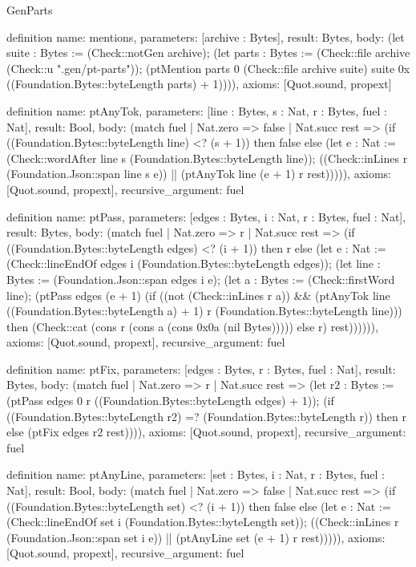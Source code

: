\begin{lexlean}{GenParts}
\begin{semanticmodule}
definition{
  name: mentions,
  parameters: [archive : Bytes],
  result: Bytes,
  body: (let suite : Bytes := (Check::notGen archive); (let parts : Bytes := (Check::file archive (Check::u ".gen/pt-parts")); (ptMention parts 0 (Check::file archive suite) suite 0x ((Foundation.Bytes::byteLength parts) + 1)))),
  axioms: [Quot.sound, propext]
}

definition{
  name: ptAnyTok,
  parameters: [line : Bytes, s : Nat, r : Bytes, fuel : Nat],
  result: Bool,
  body: (match fuel
    | Nat.zero => false
    | Nat.succ rest => (if ((Foundation.Bytes::byteLength line) <? (s + 1)) then false else (let e : Nat := (Check::wordAfter line s (Foundation.Bytes::byteLength line)); ((Check::inLines r (Foundation.Json::span line s e)) || (ptAnyTok line (e + 1) r rest))))),
  axioms: [Quot.sound, propext],
  recursive_argument: fuel
}

definition{
  name: ptPass,
  parameters: [edges : Bytes, i : Nat, r : Bytes, fuel : Nat],
  result: Bytes,
  body: (match fuel
    | Nat.zero => r
    | Nat.succ rest => (if ((Foundation.Bytes::byteLength edges) <? (i + 1)) then r else (let e : Nat := (Check::lineEndOf edges i (Foundation.Bytes::byteLength edges)); (let line : Bytes := (Foundation.Json::span edges i e); (let a : Bytes := (Check::firstWord line); (ptPass edges (e + 1) (if ((not (Check::inLines r a)) && (ptAnyTok line ((Foundation.Bytes::byteLength a) + 1) r (Foundation.Bytes::byteLength line))) then (Check::cat (cons r (cons a (cons 0x0a (nil Bytes))))) else r) rest)))))),
  axioms: [Quot.sound, propext],
  recursive_argument: fuel
}

definition{
  name: ptFix,
  parameters: [edges : Bytes, r : Bytes, fuel : Nat],
  result: Bytes,
  body: (match fuel
    | Nat.zero => r
    | Nat.succ rest => (let r2 : Bytes := (ptPass edges 0 r ((Foundation.Bytes::byteLength edges) + 1)); (if ((Foundation.Bytes::byteLength r2) =? (Foundation.Bytes::byteLength r)) then r else (ptFix edges r2 rest)))),
  axioms: [Quot.sound, propext],
  recursive_argument: fuel
}

definition{
  name: ptAnyLine,
  parameters: [set : Bytes, i : Nat, r : Bytes, fuel : Nat],
  result: Bool,
  body: (match fuel
    | Nat.zero => false
    | Nat.succ rest => (if ((Foundation.Bytes::byteLength set) <? (i + 1)) then false else (let e : Nat := (Check::lineEndOf set i (Foundation.Bytes::byteLength set)); ((Check::inLines r (Foundation.Json::span set i e)) || (ptAnyLine set (e + 1) r rest))))),
  axioms: [Quot.sound, propext],
  recursive_argument: fuel
}


\end{semanticmodule}
\end{lexlean}

